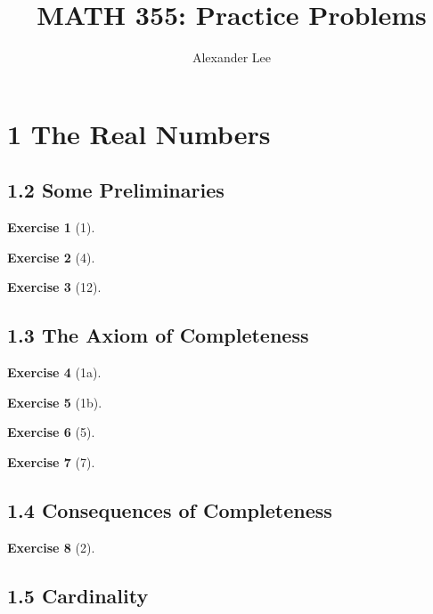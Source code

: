 \documentclass{amsart}
\title{MATH 355: Practice Problems}
\author{Alexander Lee}
\theoremstyle{definition}
\newtheorem*{exercise}{Exercise}
\begin{document}
\maketitle

\section*{1 The Real Numbers}

\subsection*{1.2 Some Preliminaries}

\begin{exercise}[1]
\end{exercise}

\begin{exercise}[4]
\end{exercise}

\begin{exercise}[12]
\end{exercise}

\subsection*{1.3 The Axiom of Completeness}

\begin{exercise}[1a]
\end{exercise}

\begin{exercise}[1b]
\end{exercise}

\begin{exercise}[5]
\end{exercise}

\begin{exercise}[7]
\end{exercise}

\subsection*{1.4 Consequences of Completeness}

\begin{exercise}[2]
\end{exercise}

\subsection*{1.5 Cardinality}
\end{document}
